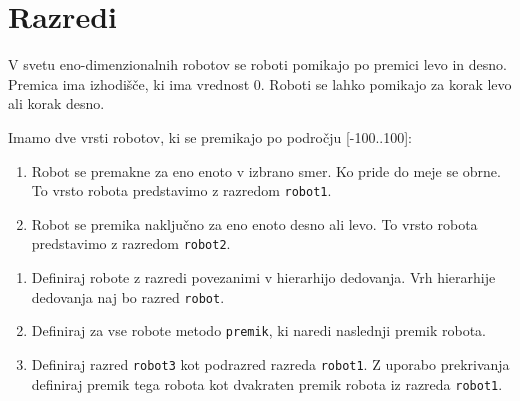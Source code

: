 \section{Razredi}


\begin{ex}
  V svetu eno-dimenzionalnih robotov se roboti pomikajo po premici
  levo in desno. Premica ima izhodi\v s\v ce, ki ima vrednost
  0. Roboti se lahko pomikajo za korak levo ali korak desno. 

  Imamo dve vrsti robotov, ki se premikajo po podro\v cju [-100..100]:

  \begin{enumerate}
  \item Robot se premakne za eno enoto v izbrano smer. Ko pride do
    meje se obrne. To vrsto robota predstavimo z razredom
    \texttt{robot1}.

  \item Robot se premika naklju\v cno za eno enoto desno ali levo. To
    vrsto robota predstavimo z razredom \texttt{robot2}.
  \end{enumerate}

  \begin{enumerate}[label=(\roman*)]
  \item Definiraj robote z razredi povezanimi v hierarhijo
    dedovanja. Vrh hierarhije dedovanja naj bo razred \texttt{robot}.

  \item Definiraj za vse robote metodo \texttt{premik}, ki naredi
    naslednji premik robota.

  \item Definiraj razred \texttt{robot3} kot podrazred razreda
    \texttt{robot1}. Z uporabo prekrivanja definiraj premik tega
    robota kot dvakraten premik robota iz razreda \texttt{robot1}.
  \end{enumerate}


\end{ex} 

